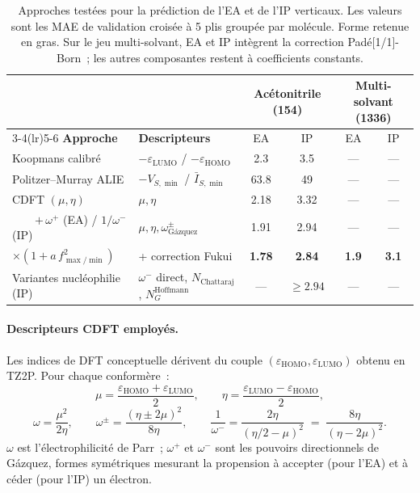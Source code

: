 \begin{table}[H]
\centering
\caption{Approches testées pour la prédiction de l'EA et de l'IP verticaux. Les valeurs sont les MAE de validation croisée à 5 plis groupée par molécule. Forme retenue en gras. Sur le jeu multi-solvant, EA et IP intègrent la correction Padé[1/1]-Born~; les autres composantes restent à coefficients constants.}
\label{tab:app_ea_ip_journey}
\footnotesize
\begin{tabular}{l l c c c c}
\toprule
 & & \multicolumn{2}{c}{Acétonitrile (154)} & \multicolumn{2}{c}{Multi-solvant (1336)} \\
\cmidrule(lr){3-4}\cmidrule(lr){5-6}
\textbf{Approche} & \textbf{Descripteurs} & EA & IP & EA & IP \\
\midrule
Koopmans calibré       & $-\varepsilon_\text{LUMO}$ / $-\varepsilon_\text{HOMO}$ & 2.3 & 3.5 & --- & --- \\
Politzer--Murray ALIE  & $-V_{S,\min}$ / $\bar{I}_{S,\min}$ & 63.8 & 49 & --- & --- \\
CDFT $(\mu, \eta)$     & $\mu, \eta$ & 2.18 & 3.32 & --- & --- \\
~~~~$+\, \omega^+$ (EA) / $1/\omega^-$ (IP) & $\mu, \eta, \omega^\pm_\text{Gázquez}$ & 1.91 & 2.94 & --- & --- \\
\textbf{\quad{}$\times (1 + a\,f^2_{\max/\min})$} & + correction Fukui & \textbf{1.78} & \textbf{2.84} & \textbf{1.9} & \textbf{3.1} \\
Variantes nucléophilie (IP) & $\omega^-$ direct, $N_\text{Chattaraj}$, $N_G^\text{Hoffmann}$ & --- & $\geq 2.94$ & --- & --- \\
\bottomrule
\end{tabular}
\end{table}

\paragraph{Descripteurs CDFT employés.}
Les indices de DFT conceptuelle dérivent du couple $(\varepsilon_\text{HOMO}, \varepsilon_\text{LUMO})$ obtenu en TZ2P. Pour chaque conformère~:
\begin{equation}
\mu = \frac{\varepsilon_\text{HOMO} + \varepsilon_\text{LUMO}}{2}, \qquad
\eta = \frac{\varepsilon_\text{LUMO} - \varepsilon_\text{HOMO}}{2},
\label{eq:app_cdft_mu_eta}
\end{equation}
\begin{equation}
\omega = \frac{\mu^2}{2\eta}, \qquad
\omega^{\pm} = \frac{(\eta \pm 2\mu)^2}{8\eta}, \qquad
\frac{1}{\omega^-} = \frac{2\eta}{(\eta/2 - \mu)^2} \;=\; \frac{8\eta}{(\eta - 2\mu)^2}.
\label{eq:app_gazquez}
\end{equation}
$\omega$ est l'électrophilicité de Parr\cite{parr1999}~; $\omega^+$ et $\omega^-$ sont les pouvoirs directionnels de Gázquez\cite{gazquez2007}, formes symétriques mesurant la propension à accepter (pour l'EA) et à céder (pour l'IP) un électron.

